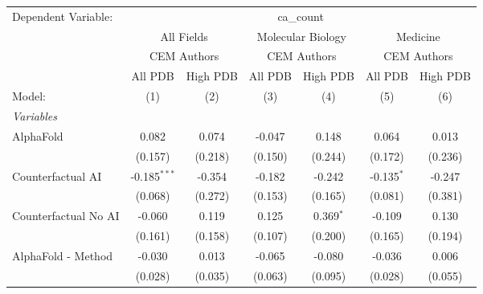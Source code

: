 \begingroup
\centering
\begin{tabular}{lcccccc}
   \tabularnewline \midrule \midrule
   Dependent Variable: & \multicolumn{6}{c}{ca\_count}\\
 & \multicolumn{2}{c}{All Fields} & \multicolumn{2}{c}{Molecular Biology} & \multicolumn{2}{c}{Medicine} \\
\cmidrule(lr){2-3} \cmidrule(lr){4-5} \cmidrule(lr){6-7}
 & \multicolumn{2}{c}{CEM Authors} & \multicolumn{2}{c}{CEM Authors} & \multicolumn{2}{c}{CEM Authors} \\
\cmidrule(lr){2-3} \cmidrule(lr){4-5} \cmidrule(lr){6-7}
 & \multicolumn{1}{c}{All PDB} & \multicolumn{1}{c}{High PDB} & \multicolumn{1}{c}{All PDB} & \multicolumn{1}{c}{High PDB} & \multicolumn{1}{c}{All PDB} & \multicolumn{1}{c}{High PDB} \\
\cmidrule(lr){2-2} \cmidrule(lr){3-3} \cmidrule(lr){4-4} \cmidrule(lr){5-5} \cmidrule(lr){6-6} \cmidrule(lr){7-7}
   Model:                                                     & (1)            & (2)     & (3)          & (4)           & (5)          & (6)\\  
   \midrule
   \emph{Variables}\\
   AlphaFold                                                  & 0.082          & 0.074   & -0.047       & 0.148         & 0.064        & 0.013\\   
                                                              & (0.157)        & (0.218) & (0.150)      & (0.244)       & (0.172)      & (0.236)\\   
   Counterfactual AI                                          & -0.185$^{***}$ & -0.354  & -0.182       & -0.242        & -0.135$^{*}$ & -0.247\\   
                                                              & (0.068)        & (0.272) & (0.153)      & (0.165)       & (0.081)      & (0.381)\\   
   Counterfactual No AI                                       & -0.060         & 0.119   & 0.125        & 0.369$^{*}$   & -0.109       & 0.130\\   
                                                              & (0.161)        & (0.158) & (0.107)      & (0.200)       & (0.165)      & (0.194)\\   
   AlphaFold - Method                                         & -0.030         & 0.013   & -0.065       & -0.080        & -0.036       & 0.006\\   
                                                              & (0.028)        & (0.035) & (0.063)      & (0.095)       & (0.028)      & (0.055)\\   

\end{tabular}
